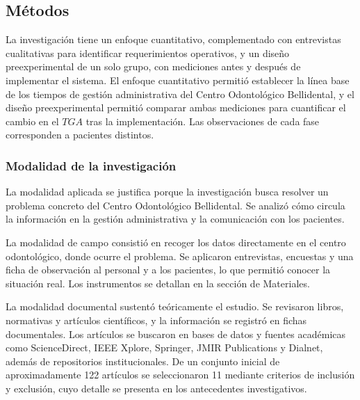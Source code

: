 \subsection{Métodos}

La investigación tiene un enfoque cuantitativo, complementado con entrevistas cualitativas para identificar requerimientos operativos, y un diseño preexperimental de un solo grupo, con mediciones antes y después de implementar el sistema. El enfoque cuantitativo permitió establecer la línea base de los tiempos de gestión administrativa del Centro Odontológico Bellidental, y el diseño preexperimental permitió comparar ambas mediciones para cuantificar el cambio en el $TGA$ tras la implementación. Las observaciones de cada fase corresponden a pacientes distintos.

\subsubsection{Modalidad de la investigación}

La modalidad aplicada se justifica porque la investigación busca resolver un problema concreto del Centro Odontológico Bellidental. Se analizó cómo circula la información en la gestión administrativa y la comunicación con los pacientes.

La modalidad de campo consistió en recoger los datos directamente en el centro odontológico, donde ocurre el problema. Se aplicaron entrevistas, encuestas y una ficha de observación al personal y a los pacientes, lo que permitió conocer la situación real. Los instrumentos se detallan en la sección de Materiales.

La modalidad documental sustentó teóricamente el estudio. Se revisaron libros, normativas y artículos científicos, y la información se registró en fichas documentales. Los artículos se buscaron en bases de datos y fuentes académicas como ScienceDirect, IEEE Xplore, Springer, JMIR Publications y Dialnet, además de repositorios institucionales. De un conjunto inicial de aproximadamente 122 artículos se seleccionaron 11 mediante criterios de inclusión y exclusión, cuyo detalle se presenta en los antecedentes investigativos.